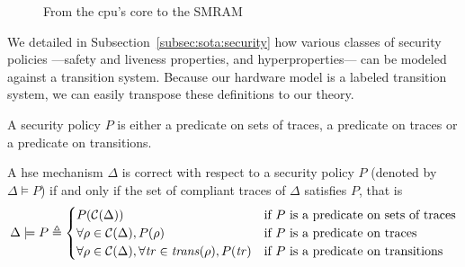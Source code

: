 \begin{figure}
  \centering

  \caption{From the \ac{cpu}'s core to the SMRAM}
  \label{fig:speccert:smram}
\end{figure}

We detailed in Subsection~\ref{subsec:sota:security} how various classes of
security policies ---safety and liveness properties, and hyperproperties--- can
be modeled against a transition system.
%
Because our hardware model is a labeled transition system, we can easily
transpose these definitions to our theory.

\begin{definition}
  A security policy \( P \) is either a predicate on sets of traces, a predicate
  on traces or a predicate on transitions.
\end{definition}

\begin{definition}
  A \ac{hse} mechanism $\Delta$ is correct with respect to a security policy $P$
  (denoted by $\Delta \models P$) if and only if the set of compliant traces of
  $\Delta$ satisfies $P$, that is
  \[
    \Delta \models P \triangleq
    \begin{cases}
      P(\mathcal{C}(\Delta)) & \text{if } P \text{ is a predicate on sets of
        traces} \\
      \forall \rho \in \mathcal{C}(\Delta), P(\rho) & \text{if } P \text{ is a
        predicate on traces} \\
      \forall \rho \in \mathcal{C}(\Delta), \forall \mathit{tr} \in
      \mathit{trans}(\rho), P(\mathit{tr}) & \text{if }P \text{ is a predicate on
        transitions}
    \end{cases}
  \]
\end{definition}

